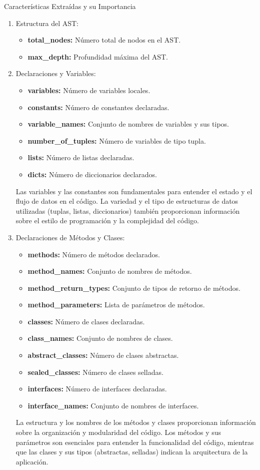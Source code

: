 Características Extraídas y su Importancia


\begin{enumerate}
	\item Estructura del AST:
    		\begin{itemize}
			\item {\bf total_nodes:} Número total de nodos en el AST.
			\item {\bf max_depth:} Profundidad máxima del AST.
		\end{itemize}
		
	 \item Declaraciones y Variables:
    \begin{itemize}
        \item {\bf variables:} Número de variables locales.
        \item {\bf constants:} Número de constantes declaradas.
        \item {\bf variable_names:} Conjunto de nombres de variables y sus tipos.
        \item {\bf number_of_tuples:} Número de variables de tipo tupla.
        \item {\bf lists:} Número de listas declaradas.
        \item {\bf dicts:} Número de diccionarios declarados.
    \end{itemize}
    Las variables y las constantes son fundamentales para entender el estado y el flujo de datos en el código. La variedad y el tipo de estructuras de datos utilizadas (tuplas, listas, diccionarios) también proporcionan información sobre el estilo de programación y la complejidad del código.

    \item Declaraciones de Métodos y Clases:
    \begin{itemize}
        \item {\bf methods:} Número de métodos declarados.
        \item {\bf method_names:} Conjunto de nombres de métodos.
        \item {\bf method_return_types:} Conjunto de tipos de retorno de métodos.
        \item {\bf method_parameters:} Lista de parámetros de métodos.
        \item {\bf classes:} Número de clases declaradas.
        \item {\bf class_names:} Conjunto de nombres de clases.
        \item {\bf abstract_classes:} Número de clases abstractas.
        \item {\bf sealed_classes:} Número de clases selladas.
        \item {\bf interfaces:} Número de interfaces declaradas.
        \item {\bf interface_names:} Conjunto de nombres de interfaces.
    \end{itemize}
    La estructura y los nombres de los métodos y clases proporcionan información sobre la organización y modularidad del código. Los métodos y sus parámetros son esenciales para entender la funcionalidad del código, mientras que las clases y sus tipos (abstractas, selladas) indican la arquitectura de la aplicación.


\end{enumerate}
